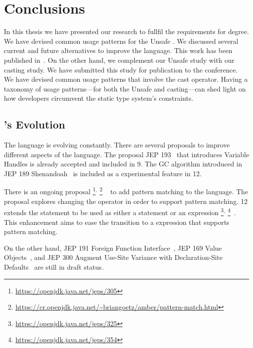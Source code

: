 \chapter{Conclusions}\label{cha:conclusions}

In this thesis we have presented our research to fullfil the requirements for \phd{} degree.
We have devised common usage patterns for the \java{} Unsafe \api{}.
We discussed several current and future alternatives to improve the
\java{} language.
This work has been published in~\citep{mastrangeloUseYourOwn2015}.
On the other hand, we complement our Unsafe \api{} study with 
our casting study.
We have submitted this study for publication to the  conference.
We have devised common usage patterns that involve the cast operator.
Having a taxonomy of usage patterns---for both the Unsafe \api{} and casting---can shed light on how \java{} developers circumvent the static type system's constraints.

\section{\java{}'s Evolution}

The \java{} language is evolving constantly.
There are several proposals to improve different aspects of the language.
The proposal JEP 193~\citep{jep193} that introduces Variable Handles is already accepted and included in \java{} 9.
The GC algorithm introduced in JEP 189 Shenandoah~\citep{jep189} is included as a experimental feature in \java{} 12.

There is an ongoing proposal%
\footnote{\url{https://openjdk.java.net/jeps/305}}$^{,}$%
\footnote{\url{https://cr.openjdk.java.net/~briangoetz/amber/pattern-match.html}}%
~\citep{jep305} to add pattern matching to the \java{} language.
The proposal explores changing the  operator in order to support pattern matching.
\java{} 12 extends the  statement to be used as either a statement or an expression%
\footnote{\url{https://openjdk.java.net/jeps/325}}$^{,}$%
\footnote{\url{https://openjdk.java.net/jeps/354}}~\citep{jep325,jep354}.
This enhancement aims to ease the transition to a  expression that supports pattern matching.

On the other hand,
JEP 191 Foreign Function Interface~\citep{jep191},
JEP 169 Value Objects~\citep{jep169}, and
JEP 300 Augment Use-Site Variance with Declaration-Site Defaults~\citep{jep300}
are still in draft status.

